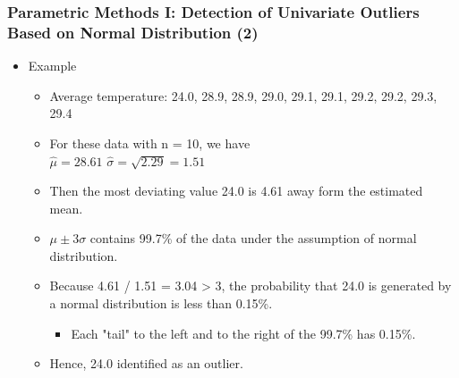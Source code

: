\documentclass[aspectratio=169,t,xcolor=dvipsnames]{beamer}
\begin{document}
\begin{frame}
	\frametitle{Parametric Methods I: Detection of Univariate Outliers Based on Normal Distribution (2)}
	\begin{itemize}
		\item Example
		      \begin{itemize}
		      	\item Average temperature: {24.0, 28.9, 28.9, 29.0, 29.1, 29.1, 29.2, 29.2, 29.3, 29.4}
		      	\item For these data with n = 10, we have \\
		      	\qquad \qquad \qquad $\widehat{\mu}=28.61$ \qquad \qquad $\widehat{\sigma}=\sqrt{2.29}=1.51$ 
		      	\item Then the most deviating value 24.0 is 4.61 away form the estimated mean.
		      	\item $\mu \pm 3\sigma $ contains 99.7\% of the data under the assumption of normal distribution.
		      	\item Because 4.61 / 1.51  =  3.04  >  3, the probability that 24.0 is generated by a normal distribution is less than 0.15\%.
		      	      \begin{itemize}
		      	      	\item Each "tail" to the left and to the right of the 99.7\% has 0.15\%.
		      	      \end{itemize}
		      	\item Hence, 24.0 identified as an outlier.
		      \end{itemize}
	\end{itemize}
\end{frame}

%
\end{document}
